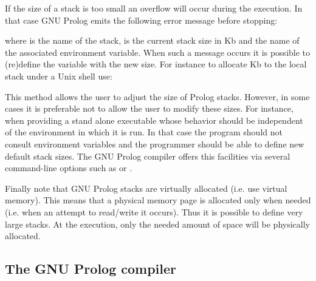 If the size of a stack is too small an overflow will occur during the
execution. In that case GNU Prolog emits the following error message before
stopping:


where  is the name of the stack,  is
the current stack size in Kb and  the name of the
associated environment variable. When such a message occurs it is possible
to (re)define the variable  with the new size. For
instance to allocate  Kb to the local stack under a Unix shell use:

\begin{CodeTwoCols}[6cm]
\end{CodeTwoCols}

This method allows the user to adjust the size of Prolog stacks. However, in
some cases it is preferable not to allow the user to modify these sizes. For
instance, when providing a stand alone executable whose behavior should be
independent of the environment in which it is run. In that case the program
should not consult environment variables and the programmer should be able
to define new default stack sizes. The GNU Prolog compiler offers this
facilities via several command-line options such as  or
 .

Finally note that GNU Prolog stacks are virtually allocated (i.e. use virtual
memory). This means that a physical memory page is allocated only when needed
(i.e. when an attempt to read/write it occurs). Thus it is possible to define
very large stacks. At the execution, only the needed amount of space will be
physically allocated.

\subsection{The GNU Prolog compiler}
\label{The-GNU-Prolog-compiler}

